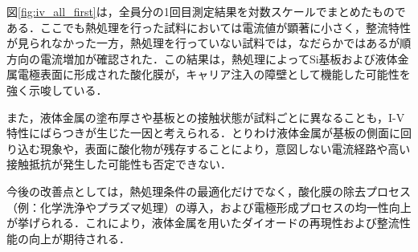 図\ref{fig:iv_all_first}は，全員分の1回目測定結果を対数スケールでまとめたものである．ここでも熱処理を行った試料においては電流値が顕著に小さく，整流特性が見られなかった一方，熱処理を行っていない試料では，なだらかではあるが順方向の電流増加が確認された．この結果は，熱処理によってSi基板および液体金属電極表面に形成された酸化膜が，キャリア注入の障壁として機能した可能性を強く示唆している．

また，液体金属の塗布厚さや基板との接触状態が試料ごとに異なることも，I-V特性にばらつきが生じた一因と考えられる．とりわけ液体金属が基板の側面に回り込む現象や，表面に酸化物が残存することにより，意図しない電流経路や高い接触抵抗が発生した可能性も否定できない．

今後の改善点としては，熱処理条件の最適化だけでなく，酸化膜の除去プロセス（例：化学洗浄やプラズマ処理）の導入，および電極形成プロセスの均一性向上が挙げられる．これにより，液体金属を用いたダイオードの再現性および整流性能の向上が期待される．
